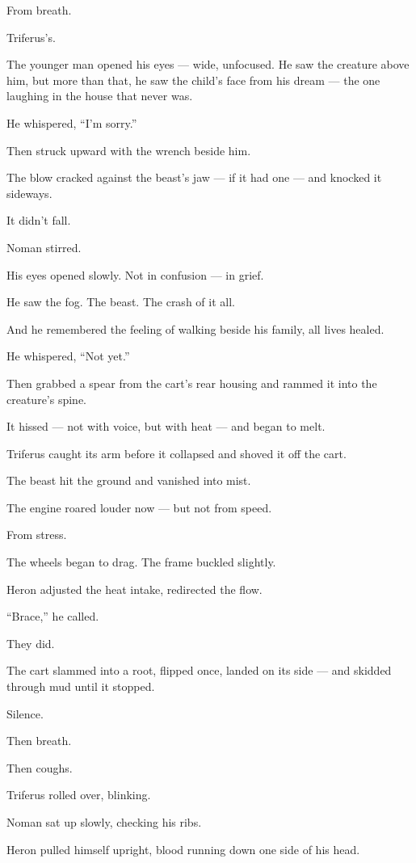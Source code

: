 \documentclass[12pt]{article}
\begin{document}
From breath.

Triferus’s.

The younger man opened his eyes — wide, unfocused. He saw the creature above him, but more than that, he saw the child’s face from his dream — the one laughing in the house that never was.

He whispered, “I’m sorry.”

Then struck upward with the wrench beside him.

The blow cracked against the beast’s jaw — if it had one — and knocked it sideways.

It didn’t fall.

Noman stirred.

His eyes opened slowly. Not in confusion — in grief.

He saw the fog. The beast. The crash of it all.

And he remembered the feeling of walking beside his family, all lives healed.

He whispered, “Not yet.”

Then grabbed a spear from the cart’s rear housing and rammed it into the creature’s spine.

It hissed — not with voice, but with heat — and began to melt.

Triferus caught its arm before it collapsed and shoved it off the cart.

The beast hit the ground and vanished into mist.

\bigskip

The engine roared louder now — but not from speed.

From stress.

The wheels began to drag. The frame buckled slightly.

Heron adjusted the heat intake, redirected the flow.

“Brace,” he called.

They did.

The cart slammed into a root, flipped once, landed on its side — and skidded through mud until it stopped.

Silence.

Then breath.

Then coughs.

\bigskip

Triferus rolled over, blinking.

Noman sat up slowly, checking his ribs.

Heron pulled himself upright, blood running down one side of his head.
\end{document}
